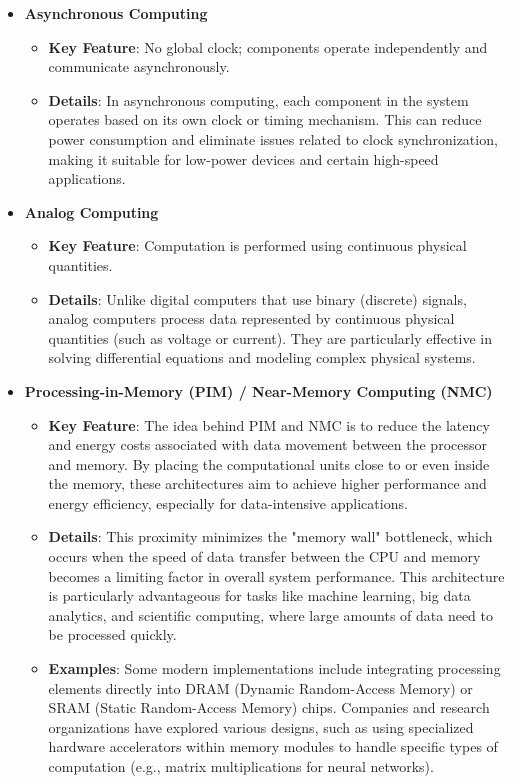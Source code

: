 \documentclass{article}
\begin{document}
\begin{itemize}
    \item{\textbf{Asynchronous Computing}}
    \begin{itemize}
        \item{\textbf{Key Feature}}: No global clock; components operate independently and communicate asynchronously.
        \item{\textbf{Details}}: In asynchronous computing, each component in the system operates based on its own clock or timing mechanism. This can reduce power consumption and eliminate issues related to clock synchronization, making it suitable for low-power devices and certain high-speed applications.
    \end{itemize}

    \item{\textbf{Analog Computing}}
    \begin{itemize}
        \item{\textbf{Key Feature}}: Computation is performed using continuous physical quantities.
        \item{\textbf{Details}}: Unlike digital computers that use binary (discrete) signals, analog computers process data represented by continuous physical quantities (such as voltage or current). They are particularly effective in solving differential equations and modeling complex physical systems.
    \end{itemize}

    \item{\textbf{Processing-in-Memory (PIM) / Near-Memory Computing (NMC)}}
    \begin{itemize}
        \item{\textbf{Key Feature}}: The idea behind PIM and NMC is to reduce the latency and energy costs associated with data movement between the processor and memory. By placing the computational units close to or even inside the memory, these architectures aim to achieve higher performance and energy efficiency, especially for data-intensive applications.
        \item{\textbf{Details}}: This proximity minimizes the "memory wall" bottleneck, which occurs when the speed of data transfer between the CPU and memory becomes a limiting factor in overall system performance. This architecture is particularly advantageous for tasks like machine learning, big data analytics, and scientific computing, where large amounts of data need to be processed quickly.
        \item{\textbf{Examples}}: Some modern implementations include integrating processing elements directly into DRAM (Dynamic Random-Access Memory) or SRAM (Static Random-Access Memory) chips. Companies and research organizations have explored various designs, such as using specialized hardware accelerators within memory modules to handle specific types of computation (e.g., matrix multiplications for neural networks).
    \end{itemize}


\end{itemize}
\end{document}
